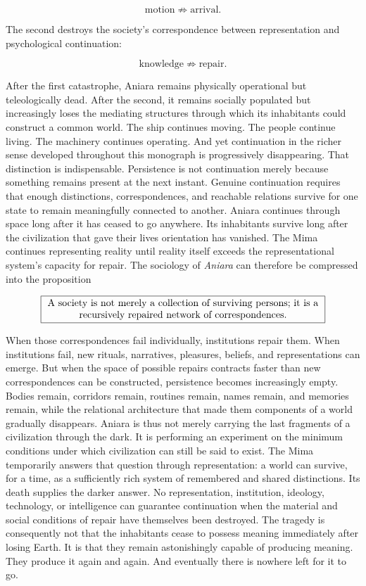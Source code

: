 \documentclass[11pt,oneside]{book}
\theoremstyle{definition}
\theoremstyle{remark}
\begin{document}
\[
\text{motion}\not\Rightarrow\text{arrival}.
\]

The second destroys the society's correspondence between representation and psychological
continuation:

\[
\text{knowledge}\not\Rightarrow\text{repair}.
\]

After the first catastrophe, Aniara remains physically operational but teleologically dead. After
the second, it remains socially populated but increasingly loses the mediating structures through
which its inhabitants could construct a common world. The ship continues moving. The people continue
living. The machinery continues operating. And yet continuation in the richer sense developed
throughout this monograph is progressively disappearing. That distinction is indispensable.
Persistence is not continuation merely because something remains present at the next instant.
Genuine continuation requires that enough distinctions, correspondences, and reachable relations
survive for one state to remain meaningfully connected to another. Aniara continues through space
long after it has ceased to go anywhere. Its inhabitants survive long after the civilization that
gave their lives orientation has vanished. The Mima continues representing reality until reality
itself exceeds the representational system's capacity for repair. The sociology of \emph{Aniara} can
therefore be compressed into the proposition

\[
\boxed{\begin{minipage}{0.82\textwidth}
\centering A society is not merely a collection of surviving persons; it is a recursively repaired network of correspondences.
\end{minipage} }
\]

When those correspondences fail individually, institutions repair them. When institutions fail, new
rituals, narratives, pleasures, beliefs, and representations can emerge. But when the space of
possible repairs contracts faster than new correspondences can be constructed, persistence becomes
increasingly empty. Bodies remain, corridors remain, routines remain, names remain, and memories
remain, while the relational architecture that made them components of a world gradually disappears.
Aniara is thus not merely carrying the last fragments of a civilization through the dark. It is
performing an experiment on the minimum conditions under which civilization can still be said to
exist. The Mima temporarily answers that question through representation: a world can survive, for a
time, as a sufficiently rich system of remembered and shared distinctions. Its death supplies the
darker answer. No representation, institution, ideology, technology, or intelligence can guarantee
continuation when the material and social conditions of repair have themselves been destroyed. The
tragedy is consequently not that the inhabitants cease to possess meaning immediately after losing
Earth. It is that they remain astonishingly capable of producing meaning. They produce it again and
again. And eventually there is nowhere left for it to go.
\end{document}
